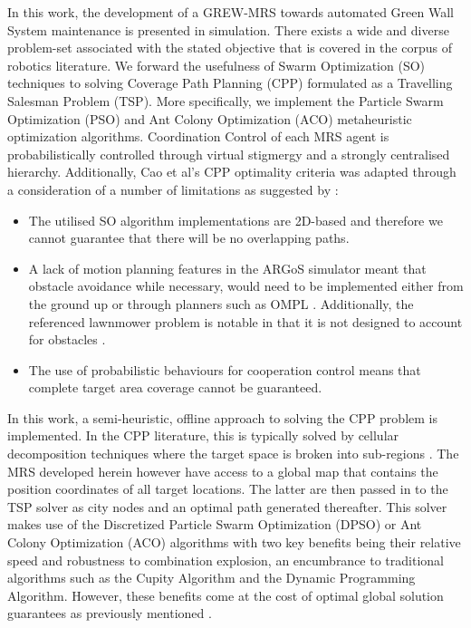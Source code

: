 \documentclass{report}
\begin{document}
In this work, the development of a GREW-MRS towards automated Green Wall System maintenance is presented in simulation. There exists a wide and diverse problem-set associated with the stated objective that is covered in the corpus of robotics literature. We forward the usefulness of Swarm Optimization (SO) techniques to solving Coverage Path Planning (CPP) formulated as a Travelling Salesman Problem (TSP). More specifically, we implement the Particle Swarm Optimization (PSO) \cite{Kennedy1995} and Ant Colony Optimization (ACO) \cite{Dorigo1997} metaheuristic optimization algorithms. Coordination Control of each MRS agent is probabilistically controlled through virtual stigmergy and a strongly centralised hierarchy. Additionally, Cao et al's \cite{Cao1988} CPP optimality criteria was adapted through a consideration of a number of limitations as suggested by \cite{Galceran2013}:
\begin{itemize}
	\item The utilised SO algorithm implementations are 2D-based and therefore we cannot guarantee that there will be no overlapping paths.
	\item A lack of motion planning features in the ARGoS simulator meant that obstacle avoidance while necessary, would need to be implemented either from the ground up or through planners such as OMPL \cite{OMPL}. Additionally, the referenced lawnmower problem is notable in that it is not designed to account for obstacles \cite{Galceran2013}.
	\item The use of probabilistic behaviours for cooperation control means that complete target area coverage cannot be guaranteed.
\end{itemize}

In this work, a semi-heuristic, offline approach to solving the CPP problem is implemented. In the CPP literature, this is typically solved by cellular decomposition techniques where the target space is broken into sub-regions \cite{Choset2001}. The MRS developed herein however have access to a global map that contains the position coordinates of all target locations. The latter are then passed in to the TSP solver as city nodes and an optimal path generated thereafter. This solver makes use of the Discretized Particle Swarm Optimization (DPSO) or Ant Colony Optimization (ACO) algorithms with two key benefits being their relative speed and robustness to combination explosion, an encumbrance to traditional algorithms such as the Cupity Algorithm and the Dynamic Programming Algorithm. However, these benefits come at the cost of optimal global solution guarantees as previously mentioned \cite{Yan2012}.
\end{document}
